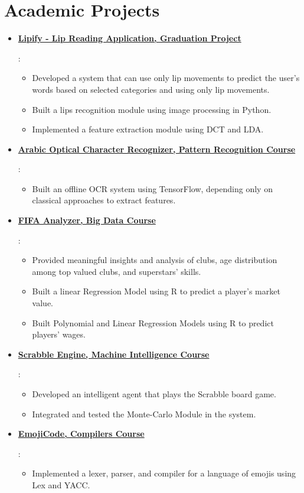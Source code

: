 \documentclass[letterpaper,11pt]{article}
\newcommand{\CvItem}[2]{
  \item\small{
    \textbf{#1}{: #2 \vspace{-2pt}}
  }
}
\newcommand{\CvSubItem}[2]{\CvItem{#1}{#2}\vspace{-4pt}}
\newcommand{\CvSubHeadingListStart}{\begin{itemize}[leftmargin=*,topsep = 0pt]}
\newcommand{\List}{\begin{itemize}[topsep = 0pt, itemsep = -1pt]}
\newcommand{\CvSubHeadingListEnd}{\end{itemize}}
\newcommand{\EndList}{\end{itemize}}
\begin{document}
\section{Academic Projects}
  \CvSubHeadingListStart
    \CvSubItem{\href{https://www.youtube.com/watch?v=Qrf6ohhCA0c&feature=youtu.be}{Lipify - Lip Reading Application, Graduation Project}}
        {\List
            \item Developed a system that can use only lip movements to predict the user’s words based on selected categories and using only lip movements.
            \item Built a lips recognition module using image processing in Python.
            \item Implemented a feature extraction module using DCT and LDA.
        \EndList}
    \CvSubItem{\href{https://github.com/amrkh97/Arabic-OCR-Using-PythonURL}{Arabic Optical Character Recognizer, Pattern Recognition Course}}
        {\List
            \item Built an offline OCR system using TensorFlow, depending only on classical approaches to extract features.
        \EndList}
    \CvSubItem{\href{https://github.com/amrkh97/FifaPredictor-BigData}{FIFA Analyzer, Big Data Course}}
        {\List
            \item Provided meaningful insights and analysis of clubs, age distribution among top valued clubs, and superstars’ skills.
            \item Built a linear Regression Model using R to predict a player’s market value.
            \item Built Polynomial and Linear Regression Models using R to predict players’ wages.
        \EndList}
    \CvSubItem{\href{https://github.com/AhmedSalemElhady/Scrabble-Game.ai}{Scrabble Engine, Machine Intelligence Course}}
        {\List
            \item Developed an intelligent agent that plays the Scrabble board game.
            \item Integrated and tested the Monte-Carlo Module in the system.
        \EndList}
    \CvSubItem{\href{https://github.com/ahmedHusseinF/emojicode}{EmojiCode, Compilers Course}}
        {\List
            \item Implemented a lexer, parser, and compiler for a language of emojis using Lex and YACC.
        \EndList}
  \CvSubHeadingListEnd

%
%
\end{document}

